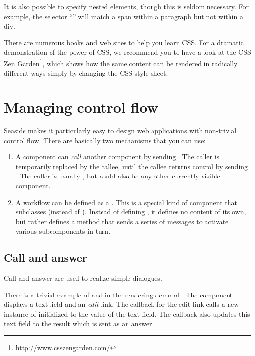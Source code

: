 \documentclass[a4paper,10pt,twoside]{book}
\begin{document}
{{It is also possible to specify nested elements, though this is seldom necessary.
For example, the selector ``'' will match a span within a paragraph but not within a div.

There are numerous books and web sites to help you learn CSS.
For a dramatic demonstration of the power of CSS, we recommend you to have a look at the CSS Zen Garden\footnote{\url{http://www.csszengarden.com/}}, which shows how the same content can be rendered in radically different ways simply by changing the CSS style sheet.

\section{Managing control flow}

Seaside makes it particularly easy to design web applications with non-trivial control flow.
There are basically two mechanisms that you can use:

\begin{enumerate}
  \item A component can \emph{call} another component by sending .
  The caller is temporarily replaced by the callee, until the callee returns control by sending .
  The caller is usually , but could also be any other currently visible component.

  \item A workflow can be defined as a .
  This is a special kind of component that subclasses  (instead of ). 
  Instead of defining , it defines no content of its own, but rather defines a  method that sends a series of  messages to activate various subcomponents in turn.
\end{enumerate}

\subsection{Call and answer}

Call and answer are used to realize simple dialogues.

There is a trivial example of  and  in the rendering demo of .
The component  displays a text field and an \emph{edit} link.
The callback for the edit link calls a new instance of  initialized to the value of the text field.
The callback also updates this text field to the result which is sent as an answer.

}}
\end{document}
